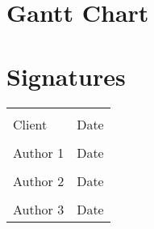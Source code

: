 \documentclass[letterpaper,10pt,notitlepage]{article}
\begin{document}
\newpage
\section*{Gantt Chart}


\newpage



\newpage
\nocite{*}




\newpage
	\section*{Signatures}
	\noindent\begin{tabular}{ll}
	\\[1cm]
	\makebox[2.5in]{\hrulefill} & \makebox[2.5in]{\hrulefill}\\
	Client & Date\\[8ex]%
	\makebox[2.5in]{\hrulefill} & \makebox[2.5in]{\hrulefill}\\
	Author 1 & Date\\[8ex]%
	\makebox[2.5in]{\hrulefill} & \makebox[2.5in]{\hrulefill}\\
	Author 2 & Date\\[8ex]%
	\makebox[2.5in]{\hrulefill} & \makebox[2.5in]{\hrulefill}\\
	Author 3 & Date\\[8ex]%
	\end{tabular}
\end{document}
